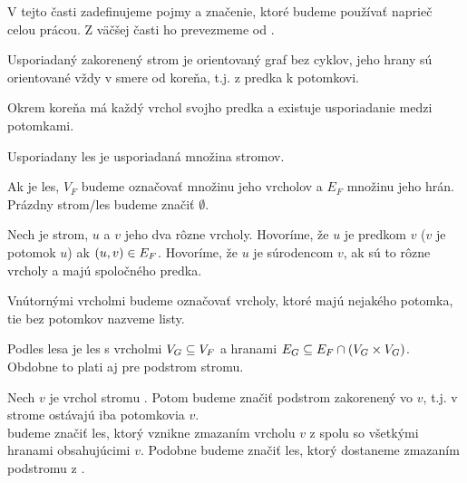 V tejto časti zadefinujeme pojmy a značenie, ktoré budeme používať naprieč celou prácou.
Z väčšej časti ho prevezmeme od \citet{RTED}.

\begin{definice}\label{def:strom}
  Usporiadaný zakorenený strom je orientovaný graf bez cyklov,
  jeho hrany sú orientované vždy v smere od koreňa, t.j. z predka k potomkovi.

  Okrem koreňa má každý vrchol svojho predka a existuje usporiadanie medzi potomkami.

  Usporiadany les je usporiadaná množina stromov.
\end{definice}

Ak  je les, $V_F$ budeme označovať množinu jeho vrcholov a $E_F$ množinu jeho hrán.
Prázdny strom/les budeme značiť $\emptyset$.

\begin{definice}
  \label{def:stromove_pojmy}
  Nech  je strom, $u$ a $v$ jeho dva rôzne vrcholy.
  Hovoríme, že $u$ je predkom $v$ ($v$ je potomok $u$) ak $(u, v) \in E_{F}$.
  Hovoríme, že $u$ je súrodencom $v$, ak sú to rôzne vrcholy a majú spoločného predka.
\end{definice}

Vnútornými vrcholmi budeme označovať vrcholy, ktoré majú nejakého potomka,
tie bez potomkov nazveme listy.

Podles lesa  je les  s vrcholmi $V_{G} \subseteq V_{F}$
a hranami $E_{G} \subseteq E_{F} \cap (V_{G} \times V_{G})$.
Obdobne to plati aj pre podstrom stromu.

Nech $v$ je vrchol stromu . Potom  budeme značiť podstrom  zakorenený vo $v$,
t.j. v strome ostávajú iba potomkovia $v$.
\\
 budeme značiť les, ktorý vznikne zmazaním vrcholu $v$ z  spolu so
všetkými hranami obsahujúcimi $v$. Podobne  budeme značiť les, ktorý
dostaneme zmazaním podstromu  z .





